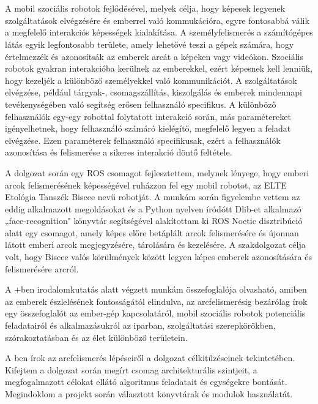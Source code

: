 \chapter{\bevezetes}
A mobil szociális robotok fejlődésével, melyek célja, hogy képesek legyenek szolgáltatások elvégzésére és emberrel való kommukációra, egyre fontosabbá válik a megfelelő interakciós képességek kialakítása. A személyfelismerés a számítógépes látás egyik legfontosabb területe, amely lehetővé teszi a gépek számára, hogy értelmezzék és azonosítsák az emberek arcát a képeken vagy videókon. Szociális robotok gyakran interakcióba kerülnek az emberekkel, ezért képesnek kell lenniük, hogy kezeljék a különböző személyekkel való kommunikációt. A szolgáltatások elvégzése, például tárgyak-, csomagszállítás, kiszolgálás és emberek mindennapi tevékenységében való segítség erősen felhasználó specifikus. A különböző felhasználók egy-egy robottal folytatott interakció során, más paramétereket igényelhetnek, hogy felhasználó számáró kielégítő, megfelelő legyen a feladat elvégzése. Ezen paraméterek felhasználó specifikusak, ezért a felhasználók azonosítása és felismerése a sikeres interakció döntő feltétele.

A dolgozat során egy ROS csomagot fejlesztettem, melynek lényege, hogy emberi arcok felismerésének képességével ruházzon fel egy mobil robotot, az ELTE Etológia Tanszék Biscee nevű robotját. A munkám során figyelembe vettem az eddig alkalmazott megoldásokat és a Python nyelven íródótt Dlib-et alkalmazó „face-recognition" könyvtár segítségével alakítottam ki ROS Noetic disztribúció alatt egy csomagot, amely képes előre betáplált arcok felismerésére és újonnan látott emberi arcok megjegyzésére, tárolására és kezelésére. A szakdolgozat célja volt, hogy Biscee valós körülmények között legyen képes emberek azonosítására és felismerésére arcról.

A \az+ben irodalomkutatás alatt végzett munkám összefoglalója olvasható, amiben az emberek észlelésének fontosságától elindulva, az arcfelismerésig bezárólag írok egy összefoglalót az ember-gép kapcsolatáról, mobil szociális robotok potenciális feladatairól és alkalmazásukról az iparban, szolgáltatási szerepkörökben, szórakoztatásban és az élet különböző területein.

A ben írok az arcfelismerés lépéseiről a dolgozat célkitűzéseinek tekintetében. Kifejtem a dolgozat során megírt csomag architekturális szintjeit, a megfogalmazott célokat ellátó algoritmus feladatait és egységekre bontását. Megindoklom a projekt során választott könyvtárak és modulok használatát.

